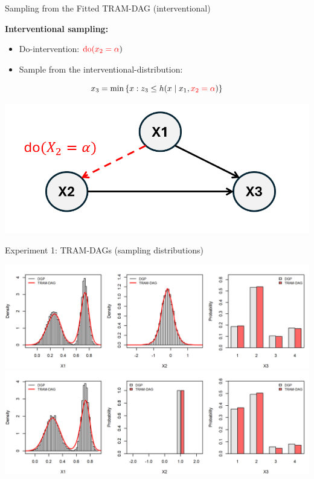 \documentclass[onlytextwidth,english]{beamer}\usepackage[]{graphicx}\usepackage[]{xcolor}
\begin{document}
\begin{frame}{Sampling from the Fitted TRAM-DAG (interventional)}

\textbf{Interventional sampling:} \\

\begin{itemize}
    \item Do-intervention: \( \textcolor{red}{\text{do}(x_2 = \alpha})\)
    \item Sample from the interventional-distribution:
\end{itemize}
\[
x_3 = \min \left\{ x : z_3 \le h(x \mid x_1, \textcolor{red}{x_2 = \alpha}) \right\}
\]

\centering
\includegraphics[width=0.5\linewidth]{img/interventional.png}


\end{frame}



\begin{frame}{Experiment 1: TRAM-DAGs (sampling distributions)}

  \centering
  \includegraphics[width=0.9\linewidth]{img/experiment1/exp1_observational_distribution.png}
  \includegraphics[width=0.9\linewidth]{img/experiment1/exp1_interventional_distribution.png}

\end{frame}
\end{document}
